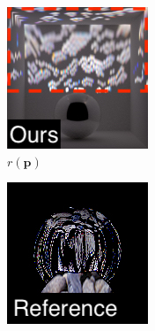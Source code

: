 \begin{figure}[]
\begin{subfigure}{\textwidth}
\begin{subfigure}{0.19\textwidth}
        \end{subfigure}
        \hfill
        \begin{subfigure}{0.19\textwidth}
            \centering
            \includegraphics[width=\textwidth]{images/04-experiment03/ball_dof/pebbles/stats_proj_highlighted2.jpg}
            \caption*{\(r(\bm{p})\)}
        \end{subfigure}
        \hfill
        \begin{subfigure}{0.19\textwidth}
            \centering
            \includegraphics[width=\textwidth]{images/04-experiment03/ball_dof/pebbles/pixel_im_label.jpg}

\end{subfigure}
\end{subfigure}
\end{figure}
